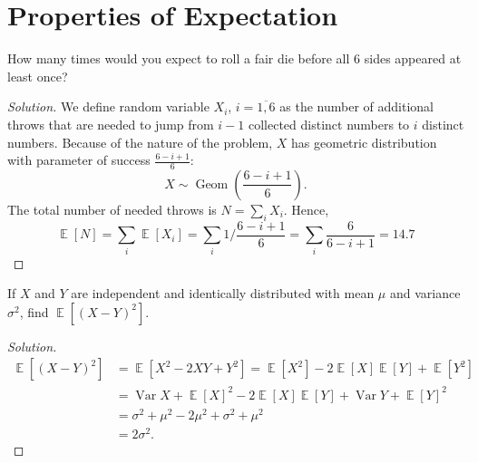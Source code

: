 \documentclass{article}[12pt]
\newenvironment{solution}
  {\renewcommand\qedsymbol{$\blacksquare$}\begin{proof}[Solution]}
  {\end{proof}}
\newenvironment{problem}[1]
  {\renewcommand\theinnercustomprblm{#1}\innercustomprblm}
  {\endinnercustomprblm}
\DeclareMathOperator{\Var}{Var}
\DeclareMathOperator{\Geo}{Geom}
\DeclareMathOperator{\E}{\mathbb{E}}
\begin{document}
\newpage

\section{Properties of Expectation}

\begin{problem}{7.22}
How many times would you expect to roll a fair die before all $6$ sides appeared at least once?
\end{problem}
\begin{solution}
We define random variable $X_i$, $i=\overline{1,6}$ as the number of additional throws that are needed to jump from $i-1$ collected distinct numbers to $i$ distinct numbers.
Because of the nature of the problem, $X$ has geometric distribution with parameter of success $\frac{6 - i + 1}{6}$:
\begin{equation*}
    X\sim\Geo\left(\frac{6 - i + 1}{6}\right).
\end{equation*}
The total number of needed throws is $N = \sum_{i}X_{i}$.
Hence,
\begin{equation*}
    \E[N] = \sum_{i}\E[X_{i}] = \sum_{i}1\Big/\frac{6 - i + 1}{6} = \sum_{i}\frac{6}{6 - i + 1} = 14.7
\end{equation*}
\end{solution}

\begin{problem}{7.30}
If $X$ and $Y$ are independent and identically distributed with mean $\mu$ and variance $\sigma^{2}$, find $\E\left[(X - Y)^{2}\right]$.
\end{problem}
\begin{solution}
\begin{align*}
    \E\left[(X - Y)^{2}\right] &= \E[X^{2} - 2XY + Y^{2}] = \E[X^{2}] - 2\E[X]\E[Y] + \E[Y^{2}]
    \\
    &= \Var X + \E[X]^{2} - 2\E[X]\E[Y] + \Var Y + \E[Y]^{2}
    \\
    &= \sigma^{2} + \mu^{2} - 2\mu^{2} + \sigma^{2} + \mu^{2}
    \\
    &= 2\sigma^{2}.
\end{align*}
\end{solution}
\end{document}
